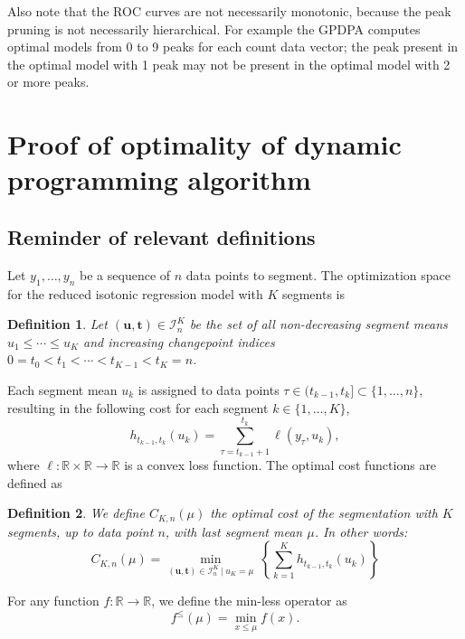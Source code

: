\documentclass{article}
\newcommand{\FCC}{C}
\newcommand{\RR}{\mathbb R}
\newtheorem{definition}{Definition}
\begin{document}
Also note that the ROC curves are not necessarily monotonic, because
the peak pruning is not necessarily hierarchical. For example the
GPDPA computes optimal models from 0 to 9 peaks for each count data
vector; the peak present in the optimal model with 1 peak may not be
present in the optimal model with 2 or more peaks.

\section{Proof of optimality of dynamic programming algorithm}

\subsection{Reminder of relevant definitions}

Let $y_1,\dots,y_n$ be a sequence of $n$ data points to segment. The
optimization space for the reduced isotonic regression model with $K$
segments is
\begin{definition}
\label{def:Ibar}
  Let $(\mathbf u, \mathbf t)\in{\mathcal I}_n^K$ be the set of
  all non-decreasing segment means $u_1\leq\cdots\leq u_K$ and
  increasing changepoint indices $0=t_0<t_1<\cdots<t_{K-1}<t_K=n$.
\end{definition}
Each segment
mean $u_k$ is assigned to data points
$\tau\in(t_{k-1},t_k]\subset\{1,\dots,n\}$, resulting in the following
cost for each segment $k\in\{1, \dots, K\}$,
\begin{equation}
  \label{eq:h}
  h_{t_{k-1}, t_k}(u_k) = \sum_{\tau=t_{k-1}+1}^{t_k} \ell(y_\tau, u_k),
\end{equation}
where $\ell:\RR\times\RR\rightarrow\RR$ is a convex loss function.
The optimal cost functions are defined as
\begin{definition}
\label{def:fcc}
  We define $\FCC_{K,n}(\mu)$ the optimal cost of the segmentation
  with $K$ segments, up to data point $n$, with last segment mean
  $\mu$. In other words:
\begin{equation}
\FCC_{K,n}(\mu) = \min_{(\mathbf u, \mathbf t)\in{\mathcal I}_n^K \ | \ u_K = \mu} \
  \left\{ \sum_{k=1}^K
  h_{t_{k-1}, t_k}(u_k) \right\}
\end{equation}
\end{definition}
For
any function $f:\RR\rightarrow\RR$, we define the min-less operator as
\begin{equation}
  \label{eq:min-less-def}
  f^\leq(\mu)=\min_{x\leq \mu} f(x).
\end{equation}
\end{document}
